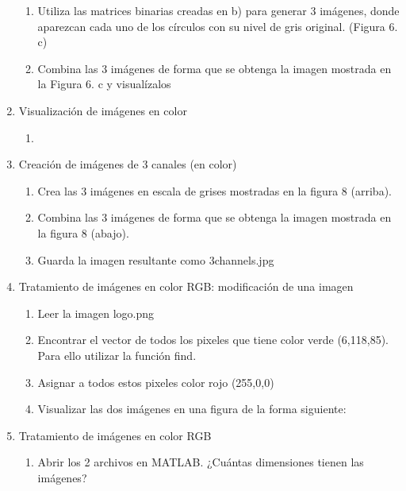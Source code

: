 \documentclass[a4paper,10pt]{article}
\begin{document}
\begin{enumerate}
\begin{enumerate}
  \item Utiliza  las  matrices  binarias  creadas  en  b)  para  generar  3  imágenes,  donde 
aparezcan cada uno de los círculos con su nivel de gris original. (Figura 6. c)

  \item Combina las  3 imágenes  de  forma  que  se  obtenga la imagen mostrada en la 
Figura 6. c y visualízalos
  
 \end{enumerate}

 \item Visualización de imágenes en color 
 
 \begin{enumerate}
  \item 
 \end{enumerate}

 \item Creación de imágenes de 3 canales (en color)
 
 \begin{enumerate}
  \item Crea las 3 imágenes en escala de grises mostradas en la figura 8 (arriba).
  \item Combina las 3 imágenes de forma que se obtenga la imagen mostrada en 
la figura 8 (abajo).
  \item Guarda la imagen resultante como 3channels.jpg
 \end{enumerate}

 \item  Tratamiento de imágenes en color RGB: modificación de una imagen 
 
 \begin{enumerate}
  \item Leer la imagen logo.png
  \item Encontrar el vector de todos los pixeles que tiene color verde (6,118,85). Para 
ello utilizar la función find.
  \item Asignar a todos estos pixeles color rojo (255,0,0)
  \item Visualizar las dos imágenes en una figura de la forma siguiente:
 \end{enumerate}

 \item Tratamiento de imágenes en color RGB
 
 \begin{enumerate}
  \item Abrir  los  2  archivos  en  MATLAB.  ¿Cuántas  dimensiones  tienen  las 
imágenes?


\end{enumerate}
\end{enumerate}
\end{document}
